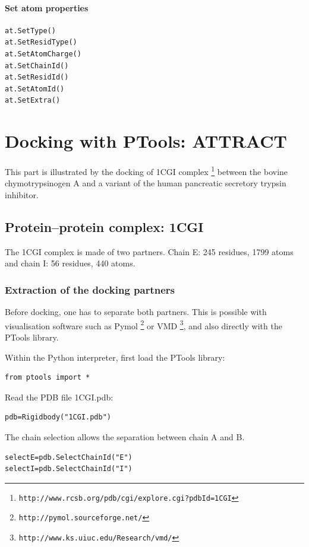 \documentclass[12pt,a4paper]{article}
\begin{document}
\paragraph{Set atom properties}
\begin{verbatim}
at.SetType()
at.SetResidType()
at.SetAtomCharge()
at.SetChainId()
at.SetResidId()
at.SetAtomId()
at.SetExtra()
\end{verbatim}

\section{Docking with PTools: ATTRACT}

This part is illustrated by the docking of 1CGI complex 
\footnote{\tt http://www.rcsb.org/pdb/cgi/explore.cgi?pdbId=1CGI} between 
the bovine chymotrypsinogen A and a variant of the human pancreatic secretory 
trypsin inhibitor.

\subsection{Protein--protein complex: 1CGI}

The 1CGI complex is made of two partners. Chain E: 245 residues, 1799 atoms and chain I: 56 residues, 440 atoms.

\subsubsection{Extraction of the docking partners}

Before docking, one has to separate both partners. This is possible with visualisation
software such as Pymol \footnote{\tt http://pymol.sourceforge.net/} or VMD \footnote{\tt http://www.ks.uiuc.edu/Research/vmd/}, 
and also directly with the PTools library.

Within the Python interpreter, first load the PTools library:
\begin{verbatim}
from ptools import *
\end{verbatim}

Read the PDB file 1CGI.pdb:
\begin{verbatim}
pdb=Rigidbody("1CGI.pdb")
\end{verbatim}

The chain selection allows the separation between chain A and B.
\begin{verbatim}
selectE=pdb.SelectChainId("E")
selectI=pdb.SelectChainId("I")
\end{verbatim}
\end{document}
